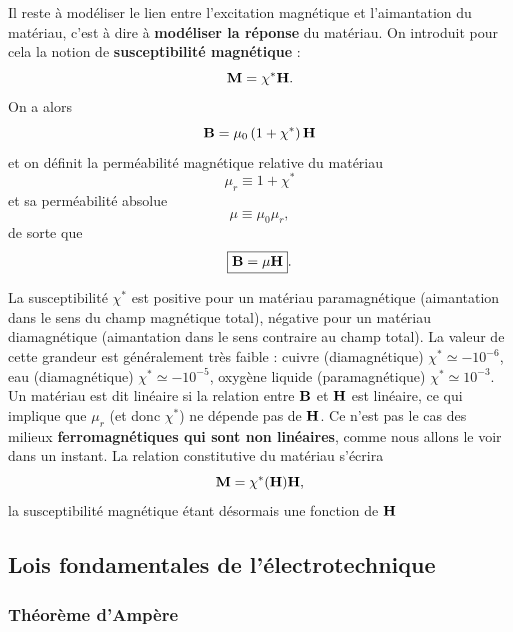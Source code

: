 \documentclass[11pt,a4paper]{report}
\begin{document}
Il reste à modéliser le lien entre l'excitation magnétique et l'aimantation du matériau, c'est à dire à \textbf{modéliser la réponse} du matériau. On introduit pour cela la notion de \textbf{susceptibilité magnétique} :
\begin{equation}
	\bold{M} = \chi^* \bold{H}.
\end{equation}
On a alors
\begin{equation}
	\bold{B} = \mu_0 \left(1 + \chi^* \right)\bold{H}
\end{equation}
et on définit la perméabilité magnétique relative du matériau
\begin{equation}
	\boxed{\mu_r \equiv 1 + \chi^*}
\end{equation}
et sa perméabilité absolue
\begin{equation}
	\boxed{\mu \equiv \mu_0\mu_r},
\end{equation}
de sorte que
\begin{equation}
	\boxed{\bold{B} = \mu\bold{H}}.
\end{equation}

La susceptibilité $\chi^*$ est positive pour un matériau paramagnétique (aimantation dans le sens du champ magnétique total), négative pour un matériau diamagnétique (aimantation dans le sens contraire au champ total). La valeur de cette grandeur est généralement très faible : cuivre (diamagnétique) $\chi^* \simeq - 10^{-6}$, eau (diamagnétique) $\chi^* \simeq - 10^{-5}$, oxygène liquide (paramagnétique) $\chi^* \simeq 10^{-3}$.\\

Un matériau est dit linéaire si la relation entre $\bold{B}$ et $\bold{H}$ est linéaire, ce qui implique que $\mu_r$ (et donc $\chi^*$) ne dépende pas de $\bold{H}$. Ce n'est pas le cas des milieux \textbf{ferromagnétiques qui sont non linéaires}, comme nous allons le voir dans un instant. La relation constitutive du matériau s'écrira
\begin{equation}
	\bold{M} = \chi^*(\bold{H}) \bold{H},
\end{equation}
la susceptibilité magnétique étant désormais une fonction de $\bold{H}$

\subsection{Lois fondamentales de l'électrotechnique}

\subsubsection{Théorème d'Ampère}
\end{document}
